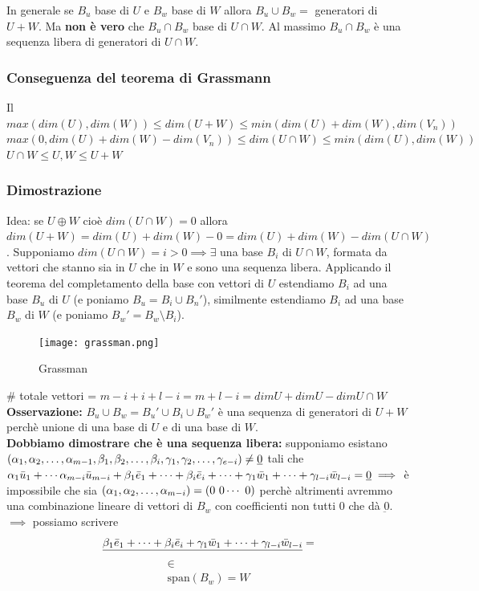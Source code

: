 \documentclass[../main.tex]{subfiles}
\begin{document}
In generale se $B_u$ base di $U$ e $B_w$ base di $W$ allora $B_u\cup B_w = $
generatori di $U+W$. Ma \textbf{non è vero} che $B_u\cap B_w$ base di $U\cap
    W$. Al massimo $B_u\cap B_w$ è una sequenza libera di generatori di $U\cap W$.

\subsubsection{Conseguenza del teorema di Grassmann}
Il $max(dim (U), dim (W))\leq dim(U+W)\leq min (dim (U)+dim (W), dim (V_n))$\\
$max (0, dim (U) + dim (W) - dim(V_n))\leq dim (U\cap W)\leq min (dim (U), dim
    (W))$ \\ $U\cap W\leq U, W\leq U+W$

\subsubsection{Dimostrazione}
Idea: se $U\oplus W$ cioè $dim (U\cap W) = 0$ allora $dim (U+W) = dim (U) + dim
    (W) - 0 = dim (U) + dim (W) - dim (U\cap W)$. Supponiamo $dim (U\cap W) = i > 0
    \implies \exists$ una base $B_i$ di $U\cap W$, formata da vettori che stanno
sia in $U$ che in $W$ e sono una sequenza libera. Applicando il teorema del
completamento della base con vettori di $U$ estendiamo $B_i$ ad una base $B_u$
di $U$ (e poniamo $B_u = B_i\cup B_n'$), similmente estendiamo $B_i$ ad una
base $B_w$ di $W$ (e poniamo $B_w' = B_w \setminus B_i$).

\begin{figure}[ht]
    \centering
    \texttt{[image: grassman.png]}
    \caption{Grassman}
    \label{fig:grassman}
\end{figure}

\# totale vettori = $m-i+i+l-i = m+l-i = dim U + dim U - dim U\cap W$ \\
\textbf{Osservazione:} $B_u\cup B_w = B_u'\cup B_i\cup B_w'$ è una sequenza di generatori di $U+W$ perchè unione di una base di $U$ e di una base di $W$.\\
\textbf{Dobbiamo dimostrare che è una sequenza libera:} supponiamo esistano $ (\alpha_1, \alpha_2, \ldots, \alpha_{m-1}, \beta_1, \beta_2, \ldots, \beta_{i}, \gamma_1, \gamma_2, \ldots, \gamma_{e-i})\ne\underbar{0}$ tali che
$\alpha_1\bar{u}_1+\cdots\alpha_{m-i}\bar{u}_{m-i}+\beta_1\bar{e}_1+\cdots+\beta_i\bar{e}_i+\cdots+\gamma_1\bar{w}_1+\cdots+\gamma_{l-i}\bar{w}_{l-i} = \underbar{0} \implies$ è impossibile che sia $(\alpha_1, \alpha_2, \ldots, \alpha_{m-i}) = (0\ 0\cdots\ 0)$ perchè altrimenti avremmo una combinazione lineare di vettori di $B_w$ con coefficienti non tutti $0$ che dà $\underbar{0}$.
$\implies$ possiamo scrivere
\[
    \underline{\beta_1\bar{e}_1+\cdots+\beta_i\bar{e}_i+\gamma_1\bar{w}_1+\cdots+\gamma_{l-i}\bar{w}_{l-i}} =
\]
\[
    \substack{\in \\ \mathrm{span}(B_w) = W}
\]
\end{document}
